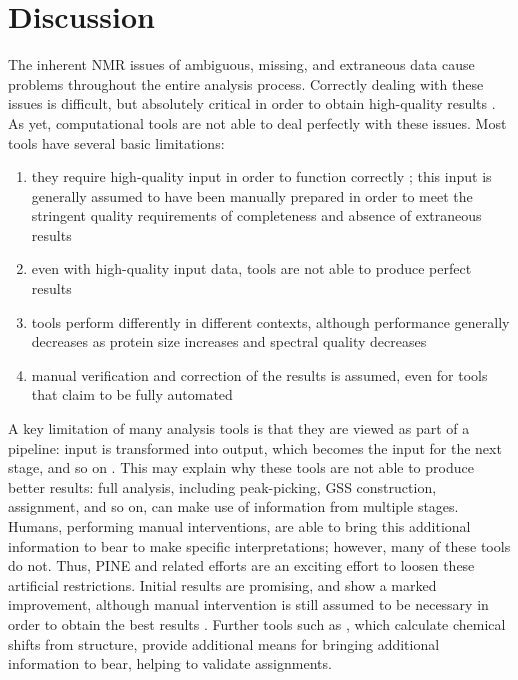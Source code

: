 \section{Discussion}

The inherent NMR issues of ambiguous, missing, and extraneous data cause 
problems throughout the entire analysis process.  Correctly dealing with 
these issues is difficult, but absolutely critical in order to obtain 
high-quality results \cite{williamson2009automated, guntert2009automated, 
altieri2004automation, baran2004automated}.  As yet, computational tools 
are not able to deal perfectly with these issues.  
Most tools have several basic limitations: 
\begin{enumerate}
  \item they require high-quality input in order to function correctly 
  \cite{saga, abacus_assignment, mars, autoassign2001, ezassign, pine, cyana2004}; 
  this input is generally assumed to have been manually prepared in order 
  to meet the stringent quality requirements of completeness and absence of 
  extraneous results
  \item even with high-quality input data, tools are not able to produce 
  perfect results 
  \item tools perform differently in different contexts, although 
  performance generally decreases as protein size increases and spectral quality 
  decreases
  \item manual verification and correction of the results is assumed, 
  even for tools that claim to be fully automated 
  \cite{williamson2009automated, guntert2009automated, altieri2004automation,
  baran2004automated}
\end{enumerate}

A key limitation of many analysis tools is that they are viewed as part of a 
pipeline: input is transformed into output, which becomes the input for the 
next stage, and so on \cite{pine}.  This may explain why these tools 
are not able to produce better results:  full analysis, including peak-picking, 
GSS construction, assignment, and so on, can make use of information from 
multiple stages.  Humans, performing manual interventions, are able to bring 
this additional information to bear to make specific interpretations; however, 
many of these tools do not.  Thus, PINE and related efforts  
are an exciting effort to loosen these artificial restrictions.  Initial 
results are promising, and show a marked improvement, although manual 
intervention is still assumed to be necessary in order to obtain the best 
results \cite{pine}.  Further tools such as \cite{shiftx2, cheshire}, 
which calculate chemical shifts from structure, provide additional means 
for bringing additional information to bear, helping to validate assignments.

